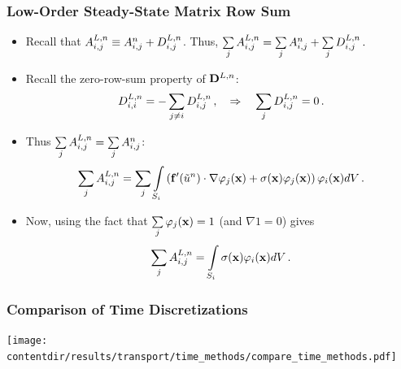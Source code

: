 \documentclass{beamer} \useoutertheme{infolines}
\newcommand{\contentdir}{../../dissertation/content}
\begin{document}
\begin{frame}
\frametitle{Low-Order Steady-State Matrix Row Sum}

\begin{itemize}
  \item Recall that $A_{i,j}^{L,n}\equiv A_{i,j}^{n}
    +D_{i,j}^{L,n}$. Thus,
      $\sum\limits_jA_{i,j}^{L,n} = \sum\limits_jA_{i,j}^{n}
      +\sum\limits_jD_{i,j}^{L,n} \,.$
  \item Recall the zero-row-sum property of $\diffusionmatrix^{L,n}$:
    \begin{equation}
      D_{i,i}^{L,n} =
        -\sum_{j\ne i}D_{i,j}^{L,n}
      \,, \quad \Rightarrow \quad
        \sum\limits_jD_{i,j}^{L,n} = 0 \,.
    \end{equation}
  \item Thus $\sum\limits_jA^{L,n}_{i,j} =
   \sum\limits_j A^{n}_{i,j}$:
\begin{equation}
  \sum\limits_jA^{L,n}_{i,j} = \sum\limits_j \int\limits_{S_i}
    \left(\mathbf{f}'(\tilde{u}^n)
      \cdot\nabla\varphi_j(\mathbf{x}) +
      \sigma(\mathbf{x})\varphi_j(\mathbf{x})\right)\varphi_i(\mathbf{x}) dV \,.
\end{equation}
  \item Now, using the fact that $\sum\limits_j\varphi_j(\mathbf{x})=1$
    (and $\nabla 1 = 0$) gives
    \begin{equation}
      \sum\limits_jA^{L,n}_{i,j} =
        \int\limits_{S_i}\sigma(\mathbf{x})\varphi_i(\mathbf{x}) dV \,.
    \end{equation}
\end{itemize}

\end{frame}
\begin{frame}
\frametitle{Comparison of Time Discretizations}

\begin{center}
   \texttt{[image: \\contentdir/results/transport/time\_methods/compare\_time\_methods.pdf]}
\end{center}

\end{frame}
\end{document}
